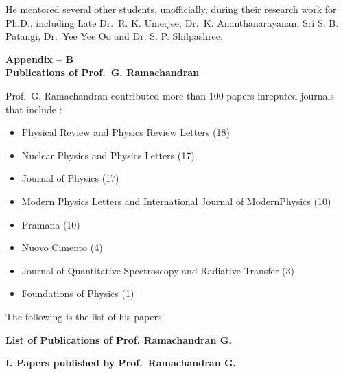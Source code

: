 He mentored several other students, unofficially, during their research work for Ph.D., including Late Dr.\ R. K. Umerjee, Dr.\ K. Ananthanarayanan, Sri S. B. Patangi, Dr.\ Yee Yee Oo and Dr. S. P. Shilpashree.

\newpage

\begin{center}
\textbf{Appendix -- B}\\[4pt]
\textbf{Publications of Prof.\ G. Ramachandran}
\end{center}

Prof.\ G. Ramachandran contributed more than 100 papers in\break reputed journals that include :
\begin{itemize}
\item Physical Review and Physics Review Letters (18)
\item Nuclear Physics and Physics Letters (17)
\item Journal of Physics (17)
\item Modern Physics Letters and International Journal of Modern\break Physics (10) 
\item Pramana (10)
\item Nuovo Cimento (4)
\item Journal of Quantitative Spectroscopy and Radiative Transfer (3)
\item Foundations of Physics (1)
\end{itemize}

The following is the list of his papers.

\newpage

\begin{center}
{\large\bfseries List of Publications of Prof. Ramachandran G.}
\end{center}

\noindent
\textbf{I. Papers published by Prof.\ Ramachandran G.}

\medskip

